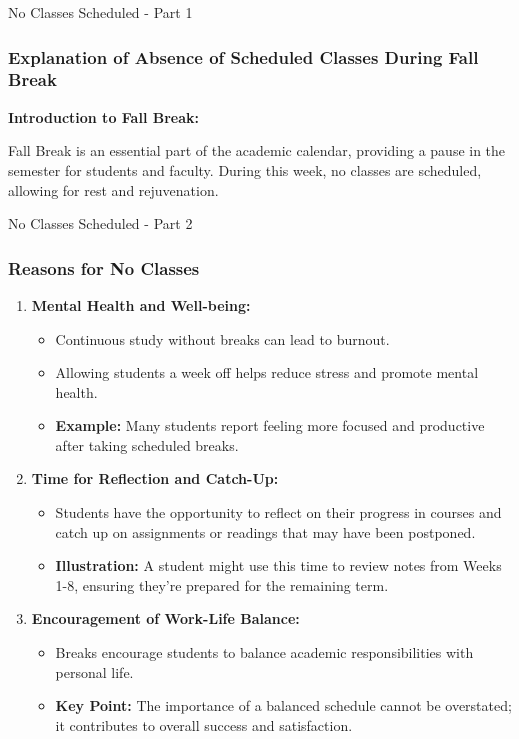 \documentclass[aspectratio=169]{beamer}
\begin{document}
\begin{frame}[fragile]{No Classes Scheduled - Part 1}
    \frametitle{Explanation of Absence of Scheduled Classes During Fall Break}
    
    \textbf{Introduction to Fall Break:}
    
    Fall Break is an essential part of the academic calendar, providing a pause in the semester for students and faculty. During this week, no classes are scheduled, allowing for rest and rejuvenation.
\end{frame}

\begin{frame}[fragile]{No Classes Scheduled - Part 2}
    \frametitle{Reasons for No Classes}
    
    \begin{enumerate}
        \item \textbf{Mental Health and Well-being:}
        \begin{itemize}
            \item Continuous study without breaks can lead to burnout.
            \item Allowing students a week off helps reduce stress and promote mental health.
            \item \textbf{Example:} Many students report feeling more focused and productive after taking scheduled breaks.
        \end{itemize}
        
        \item \textbf{Time for Reflection and Catch-Up:}
        \begin{itemize}
            \item Students have the opportunity to reflect on their progress in courses and catch up on assignments or readings that may have been postponed.
            \item \textbf{Illustration:} A student might use this time to review notes from Weeks 1-8, ensuring they’re prepared for the remaining term.
        \end{itemize}
        
        \item \textbf{Encouragement of Work-Life Balance:}
        \begin{itemize}
            \item Breaks encourage students to balance academic responsibilities with personal life.
            \item \textbf{Key Point:} The importance of a balanced schedule cannot be overstated; it contributes to overall success and satisfaction.
        \end{itemize}
        

\end{enumerate}
\end{frame}
\end{document}
